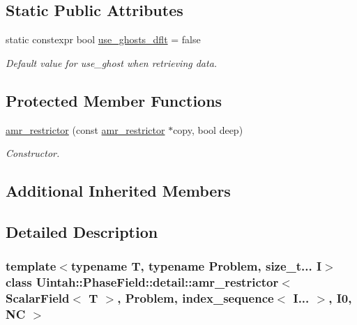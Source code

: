 \subsection*{Static Public Attributes}
\begin{DoxyCompactItemize}
\item 
static constexpr bool \hyperlink{classUintah_1_1PhaseField_1_1detail_1_1amr__restrictor_3_01ScalarField_3_01T_01_4_00_01Problem_05760ee5d1d3adcc969b3f56f71e72acb_a1579c120a731bc2c5e5d53a3e3db51dc}{use\+\_\+ghosts\+\_\+dflt} = false
\begin{DoxyCompactList}\small\item\em Default value for use\+\_\+ghost when retrieving data. \end{DoxyCompactList}\end{DoxyCompactItemize}
\subsection*{Protected Member Functions}
\begin{DoxyCompactItemize}
\item 
\hyperlink{classUintah_1_1PhaseField_1_1detail_1_1amr__restrictor_3_01ScalarField_3_01T_01_4_00_01Problem_05760ee5d1d3adcc969b3f56f71e72acb_a9d8bbe1e77519c3e16e93d047a231da5}{amr\+\_\+restrictor} (const \hyperlink{classUintah_1_1PhaseField_1_1detail_1_1amr__restrictor}{amr\+\_\+restrictor} $\ast$copy, bool deep)
\begin{DoxyCompactList}\small\item\em Constructor. \end{DoxyCompactList}\end{DoxyCompactItemize}
\subsection*{Additional Inherited Members}


\subsection{Detailed Description}
\subsubsection*{template$<$typename T, typename Problem, size\+\_\+t... I$>$\newline
class Uintah\+::\+Phase\+Field\+::detail\+::amr\+\_\+restrictor$<$ Scalar\+Field$<$ T $>$, Problem, index\+\_\+sequence$<$ I... $>$, I0, N\+C $>$}

